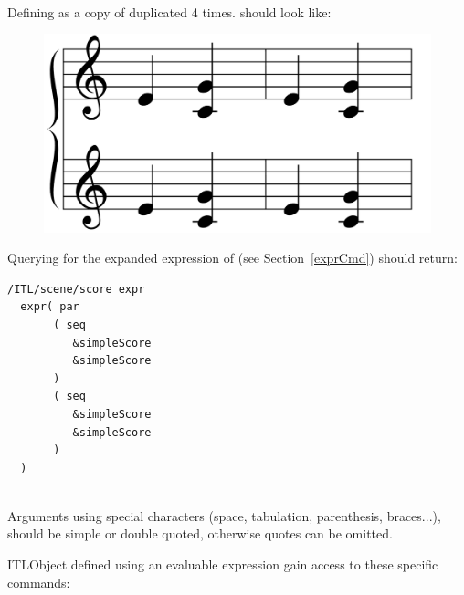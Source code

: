 \selayout
\example\\
Defining  as a copy of  duplicated 4 times.
 should look like:\\
\begin{figure}[H]
\begin{center}
 \includegraphics[scale=0.1]{imgs/seqparEnhanced}
\end{center}
\end{figure}

Querying for the expanded expression of  (see Section~\ref{exprCmd}) should return:
\begin{verbatim}
/ITL/scene/score expr
  expr( par
       ( seq
          &simpleScore
          &simpleScore
       )
       ( seq
          &simpleScore
          &simpleScore
       )
  )
\end{verbatim}
\smallbreak

 \\
Arguments using special characters (space, tabulation, parenthesis, braces...), should be simple or double quoted, otherwise quotes can be omitted.



\label{exprCmd}

ITLObject defined using an evaluable expression gain access to these specific commands:

